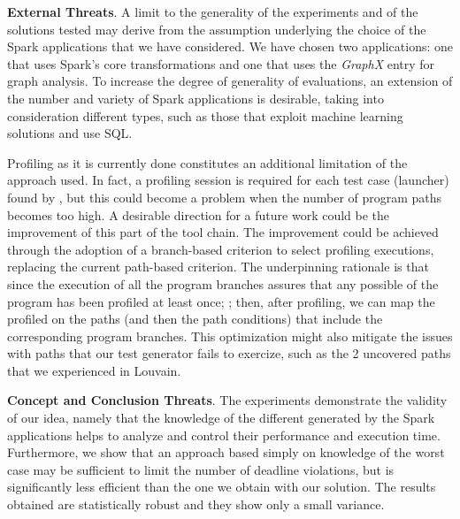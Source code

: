 \textbf{External Threats}. A limit to the generality of the experiments and of the solutions tested may derive from the assumption underlying the choice of the Spark applications that we have considered. We have chosen two applications: one that uses Spark's core transformations and one that uses the \textit{GraphX} entry for graph analysis. To increase the degree of generality of evaluations, an extension of the number and variety of Spark applications is desirable, taking into consideration different types, such as those that exploit machine learning solutions and use SQL.

Profiling as it is currently done constitutes an additional limitation of the approach used. In fact, a profiling session is required for each test case (launcher) found by \dSymb, but this could become a problem when the number of program paths becomes too high. A desirable direction for a future work could be the improvement of this part of the tool chain. The improvement could be achieved through the adoption of a branch-based criterion to select profiling executions, replacing the current path-based criterion. The underpinning rationale is that since the execution of all the program branches assures that any possible \plan of the program has been profiled at least once; ; then, after profiling, we can map the profiled \plans on the paths (and then the path conditions) that include the corresponding program branches. This optimization might also mitigate the issues with paths that our test generator fails to exercize, such as the 2 uncovered paths that we experienced in Louvain.

\textbf{Concept and Conclusion Threats}. The experiments demonstrate the validity of our idea, namely that the knowledge of the different \plans generated by the Spark applications helps to analyze and control their performance and execution time. Furthermore, we show that an approach based simply on knowledge of the worst case may be sufficient to limit the number of deadline violations, but is significantly less efficient than the one we obtain with our solution. The results obtained are statistically robust and they show only a small variance. 
